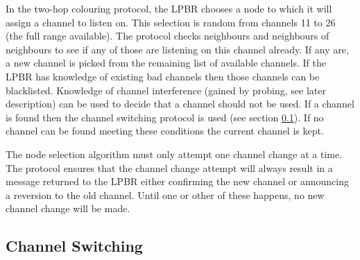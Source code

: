 In the two-hop colouring protocol, the LPBR chooses a node to which it will assign a channel to listen on.  
This selection is random from channels 11 to 26 (the full range available). The protocol checks neighbours and neighbours of neighbours to see if any of those are listening on this channel already. If any are, a new channel is picked from the remaining list of available channels. If the LPBR has knowledge of existing bad channels then those channels can be blacklisted.  Knowledge of channel interference (gained by probing, see later description) can be used to decide that a channel should not be used. If a channel is found then the channel switching protocol is used (see section \ref{sec:channelswitch}). If no channel can be found meeting these conditions the current
channel is kept.  

The node selection algorithm must only attempt one channel change at a time. The protocol ensures that the channel change attempt will always result in a message returned to the LPBR either confirming the new channel or announcing a reversion to the old channel. Until one or other of these happens, no new channel change will be made.





\subsection{Channel Switching}
\label{sec:channelswitch}

